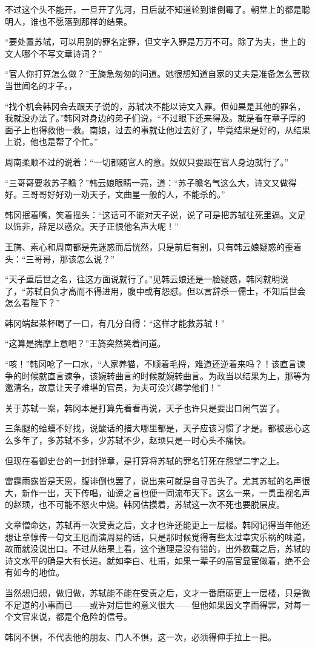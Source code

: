 不过这个头不能开，一旦开了先河，日后就不知道轮到谁倒霉了。朝堂上的都是聪明人，谁也不愿落到那样的结果。

“要处置苏轼，可以用别的罪名定罪，但文字入罪是万万不可。除了为夫，世上的文人哪个不写文章诗词？”

“官人你打算怎么做？”王旖急匆匆的问道。她很想知道自家的丈夫是准备怎么营救当世闻名的才子。，

“找个机会韩冈会去跟天子说的，苏轼决不能以诗文入罪。但如果是其他的罪名，我就没办法了。”韩冈对身边的弟子们说，“不过眼下还来得及。就是看在章子厚的面子上也得救他一救。南娘，过去的事就让他过去好了，毕竟结果是好的，从结果上说，他也是帮了个忙。”

周南柔顺不过的说着：“一切都随官人的意。奴奴只要跟在官人身边就行了。”

“三哥哥要救苏子瞻？”韩云娘眼睛一亮，道：“苏子瞻名气这么大，诗文又做得好。三哥哥好好劝一劝天子，文曲星一般的人，不能杀的。”

韩冈抿着嘴，笑着摇头：“这话可不能对天子说，说了可是把苏轼往死里逼。文足以饰非，辞足以惑众。天子正恨他名声大呢！”

王旖、素心和周南都是先迷惑而后恍然，只是前后有别，只有韩云娘疑惑的歪着头：“三哥哥，那该怎么说？”

“天子重后世之名，往这方面说就行了。”见韩云娘还是一脸疑惑，韩冈就明说了，“苏轼自负才高而不得进用，腹中或有怨怼。但以言辞杀一儒士，不知后世会怎么看陛下？”

韩冈端起茶杯喝了一口，有几分自得：“这样才能救苏轼！”

“这算是揣摩上意吧？”王旖突然笑着问道。

“咳！”韩冈呛了一口水，“人家养猫，不顺着毛捋，难道还逆着来吗？！该直言谏争的时候就直言谏争，该婉转曲言的时候就婉转曲言。为政当以结果为上，那等为邀清名，故意让天子难堪的官员，为夫可没兴趣学他们！”

关于苏轼一案，韩冈本是打算先看看再说，天子也许只是要出口闲气罢了。

三条腿的蛤蟆不好找，说酸话的措大哪里都是，天子应该习惯了才是。都被恶心这么多年了，多苏轼不多，少苏轼不少，赵顼只是一时心头不痛快。

但现在看御史台的一封封弹章，是打算将苏轼的罪名钉死在怨望二字之上。

雷霆雨露皆是天恩，腹诽倒也罢了，说出来可就是自寻苦头了。尤其苏轼的名声很大，新作一出，天下传唱，讪谤之言也便一同流布天下。这么一来，一贯重视名声的赵顼，也不可能不怒火中烧。韩冈估摸着，苏轼这一次不死也要脱层皮。

文章憎命达，苏轼再一次受责之后，文才也许还能更上一层楼。韩冈记得当年他还想让章惇传一句文王厄而演周易的话，只是那时候觉得有些太过幸灾乐祸的味道，故而就没说出口。不过从结果上看，这个道理是没有错的，出外数载之后，苏轼的诗文水平的确是大有长进。就如李白、杜甫，如果一辈子的高官显宦做着，绝不会有如今的地位。

当然想归想，做归做，苏轼能不能在受责之后，文才一番磨砺更上一层楼，只是微不足道的小事而已——或许对后世的意义很大——但他如果因文字而得罪，对每一个文官来说，都是个危险的信号。

韩冈不惧，不代表他的朋友、门人不惧，这一次，必须得伸手拉上一把。

